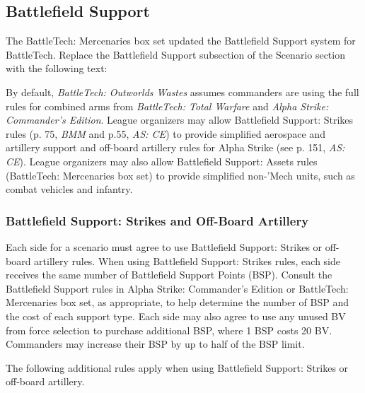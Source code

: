 \subsection{Battlefield Support}

The BattleTech: Mercenaries box set updated the Battlefield Support system for BattleTech.
Replace the Battlefield Support subsection of the Scenario section with the following text:

By default, \emph{BattleTech: Outworlds Wastes} assumes commanders are using the full rules for combined arms from \emph{BattleTech: Total Warfare} and \emph{Alpha Strike: Commander's Edition}.
League organizers may allow Battlefield Support: Strikes rules (p. 75, \emph{BMM}  and p.55, \emph{AS: CE}) to provide simplified aerospace and artillery support and off-board artillery rules for Alpha Strike (see p. 151, \emph{AS: CE}).
League organizers may also allow Battlefield Support: Assets rules (BattleTech: Mercenaries box set) to provide simplified non-'Mech units, such as combat vehicles and infantry.

\subsubsection{Battlefield Support: Strikes and Off-Board Artillery}

Each side for a scenario must agree to use Battlefield Support: Strikes or off-board artillery rules.
When using Battlefield Support: Strikes rules, each side receives the same number of Battlefield Support Points (BSP).
Consult the Battlefield Support rules in Alpha Strike: Commander's Edition or BattleTech: Mercenaries box set, as appropriate, to help determine the number of BSP and the cost of each support type.
Each side may also agree to use any unused BV from force selection to purchase additional BSP, where 1 BSP costs 20 BV.
Commanders may increase their BSP by up to half of the BSP limit.

The following additional rules apply when using Battlefield Support: Strikes or off-board artillery.

